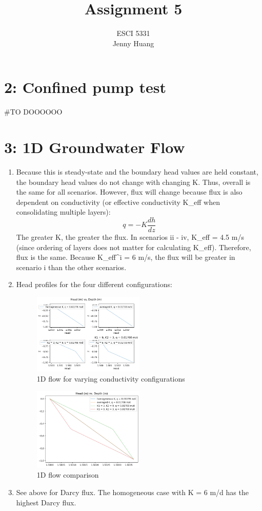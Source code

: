 \documentclass{article}
\title{Assignment 5}
\author{ESCI 5331 \\ Jenny Huang}
\date{}
\begin{document}
\maketitle

\section*{2: Confined pump test}
#TO DOOOOOO
\section*{3: 1D Groundwater Flow}
\begin{enumerate}[label=\alph*]  
    \item Because this is steady-state and the boundary head values are held constant, the boundary head values do not change with changing K. 
    Thus, overall  is the same for all scenarios. 
    However, flux will change because flux is also dependent on conductivity (or effective conductivity K_{eff} when consolidating multiple layers): 
    \[
    q = -K\frac{dh}{dz}
    \]
    The greater K, the greater the flux. In scenarios ii - iv, K_{eff} = 4.5 m/s (since ordering of layers does not matter for calculating K_{eff}). Therefore, flux is the same. 
    Because K_{eff}^i = 6 m/s, the flux will be greater in scenario i than the other scenarios. 
    
    \item Head profiles for the four different configurations:
    \begin{figure}[H]
        \centering
        \includegraphics[width=0.5\textwidth]{model_runs/hw5_1d_all_cases_separate.png}
        \caption{1D flow for varying conductivity configurations}
    \end{figure}
    \begin{figure}[H]
        \centering
        \includegraphics[width=0.5\textwidth]{model_runs/hw5_1d_all_cases.png}
        \caption{1D flow comparison}
    \end{figure}
    \item See above for Darcy flux. The homogeneous case with K = 6 m/d has the highest Darcy flux. 
\end{enumerate}
\end{document}
